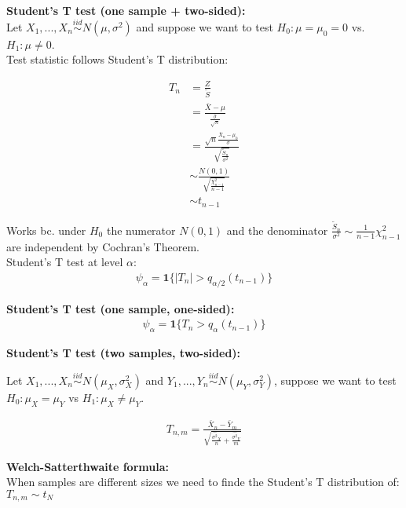 \textbf{Student's T test (one sample + two-sided):}\\

Let $X_1, ..., X_n \stackrel{iid}{\sim} N(\mu,\sigma^2)$ and suppose we want to test $H_0: \mu = \mu_0 = 0$ vs. $H_1: \mu \neq 0$.\\

Test statistic follows Student's T distribution:

\begin{align*}
T_n &= \frac{Z}{\tilde{S}} \\
&= \frac{\bar{X}-\mu}{\frac{\hat{\sigma}}{\sqrt{n}}}\\
&=\frac{\displaystyle \sqrt{n}\frac{\bar{X}_n - \mu_0}{\sigma}}{\displaystyle \sqrt{\frac{\tilde{S}_n}{\sigma^2}}}\\
&\sim \frac{N(0,1)}{\sqrt{\frac{\chi^2_{n-1}}{n-1}}}\\
&\sim t_{n-1}
\end{align*}

Works bc. under $H_0$ the numerator $N(0,1)$ and the denominator $\frac{\tilde{S}_n}{\sigma^2} \sim \frac1{n-1}\chi^2_{n-1}$ are independent by Cochran's Theorem.\\

Student's T test at level $\alpha$:
\begin{align*}
\psi_\alpha = \textbf{1}\{|T_n| > q_{\alpha/2}(t_{n-1})\}
\end{align*}

\textbf{Student's T test (one sample, one-sided):}
\begin{align*}
\psi_\alpha = \textbf{1}\{T_n > q_\alpha(t_{n-1})\}
\end{align*}

\textbf{Student's T test (two samples, two-sided):}

Let $X_1, ..., X_n \stackrel{iid}{\sim} N(\mu_X,\sigma^2_X)$ and $Y_1, ..., Y_n \stackrel{iid}{\sim} N(\mu_Y,\sigma^2_Y)$, suppose we want to test $H_0: \mu_X = \mu_Y$ vs $H_1: \mu_X \neq \mu_Y$.

\begin{align*}
T_{n, m} = \frac{\bar{X}_n - \bar{Y}_m}{\displaystyle \sqrt{\frac{\hat{\sigma^2}_X}n + \frac{\hat{\sigma^2}_Y}m}}
\end{align*}


\textbf{Welch-Satterthwaite formula:}\\

When samples are different sizes we need to finde the Student's T distribution of: $T_{n, m} \sim t_N$\\


